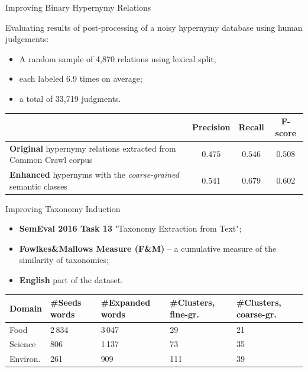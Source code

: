 \documentclass[usenames,dvipsnames,notes]{beamer}
\begin{document}
\begin{frame}{ Improving Binary Hypernymy Relations }

Evaluating results of post-processing of a noisy hypernymy database using human judgements:


\begin{itemize}
	\item A random sample of 4,870 relations using lexical split; 
	\item each labeled 6.9 times on average;
	\item a total of 33,719 judgments.
\end{itemize}

\pause 

\begin{table}
\footnotesize
\centering

\begin{tabular}{p{6cm}|c|c|c}
 & \textbf{Precision} & \textbf{Recall} & \textbf{F-score} \\ \toprule
\textbf{\alert{Original}} hypernymy relations extracted from Common Crawl corpus~\cite{seitner2016large} & $0.475$ & $0.546$ & $0.508$ \\ \midrule 
\textbf{\alert{Enhanced}} hypernyms with the \textit{coarse-grained} semantic classes   & $\mathbf{0.541}$ & $\mathbf{0.679}$ & $\mathbf{0.602}$ \\ 
\end{tabular}

\end{table}

\end{frame}


\begin{frame}{ Improving Taxonomy Induction }

\begin{itemize}
	\item \textbf{SemEval 2016 Task 13} "Taxonomy Extraction from Text";
	\item \textbf{Fowlkes\&Mallows Measure (F\&M)} -- a cumulative measure of the similarity of taxonomies;
	\item \textbf{English} part of the dataset.
\end{itemize}

\pause 



\begin{table}
\footnotesize
\centering
\begin{tabular}{l|p{0.9cm}|p{1.4cm}|p{1.3cm}|p{1.5cm}}
\textbf{Domain} & \textbf{\#Seeds words} & \textbf{\#Expanded words} & \textbf{\#Clusters}, fine-gr. & \textbf{\#Clusters}, coarse-gr.  \\ \toprule
Food & 2\,834 & 3\,047 & 29 & 21 \\
Science & 806 & 1\,137 & 73 & 35 \\
Environ. & 261 & 909 & 111 & 39 \\
\end{tabular}
\end{table}


\end{frame}
\end{document}
